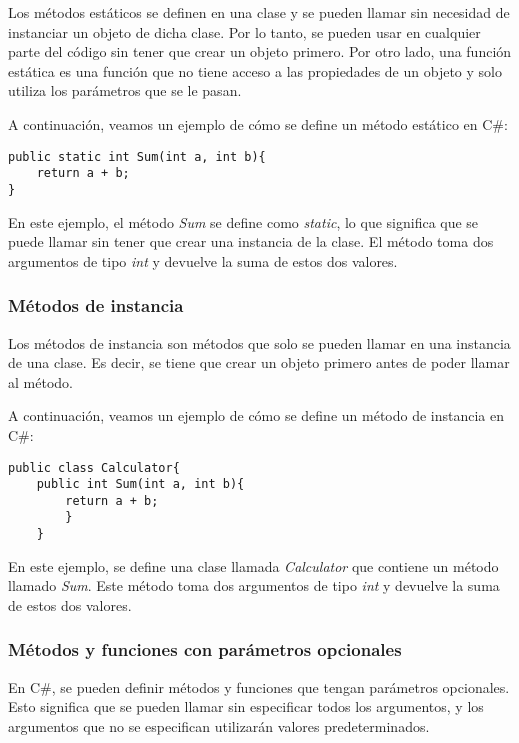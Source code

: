 \documentclass[executivepaper]{article}
\begin{document}
Los métodos estáticos se definen en una clase y se pueden llamar sin necesidad de instanciar un objeto de dicha clase. Por lo tanto, se pueden usar en cualquier parte del código sin tener que crear un objeto primero. Por otro lado, una función estática es una función que no tiene acceso a las propiedades de un objeto y solo utiliza los parámetros que se le pasan.

A continuación, veamos un ejemplo de cómo se define un método estático en C\#:

\begin{lstlisting}
public static int Sum(int a, int b){
    return a + b;
}
\end{lstlisting}

En este ejemplo, el método \emph{Sum} se define como \emph{static}, lo que significa que se puede llamar sin tener que crear una instancia de la clase. El método toma dos argumentos de tipo \emph{int} y devuelve la suma de estos dos valores.

\subsubsection*{Métodos de instancia}

Los métodos de instancia son métodos que solo se pueden llamar en una instancia de una clase. Es decir, se tiene que crear un objeto primero antes de poder llamar al método.

A continuación, veamos un ejemplo de cómo se define un método de instancia en C\#:

\begin{lstlisting}
public class Calculator{
    public int Sum(int a, int b){
        return a + b;
        }
    }
\end{lstlisting}

En este ejemplo, se define una clase llamada \emph{Calculator} que contiene un método llamado \emph{Sum}. Este método toma dos argumentos de tipo \emph{int} y devuelve la suma de estos dos valores.

\subsubsection*{Métodos y funciones con parámetros opcionales}

En C\#, se pueden definir métodos y funciones que tengan parámetros opcionales. Esto significa que se pueden llamar sin especificar todos los argumentos, y los argumentos que no se especifican utilizarán valores predeterminados.
\end{document}

